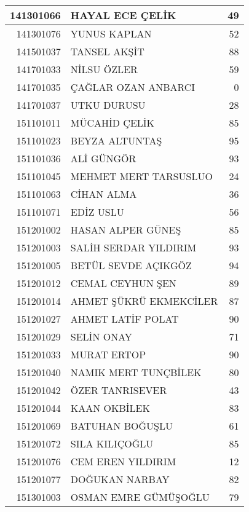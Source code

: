\documentclass[12pt]{article}
\begin{document}
\begin{longtable}{||r||l||r||}
    \midrule
    141301066 & HAYAL ECE ÇELİK & 49 \\
    \midrule
    141301076 & YUNUS KAPLAN & 52 \\
    \midrule
    141501037 & TANSEL AKŞİT & 88 \\
    \midrule
    141701033 & NİLSU ÖZLER & 59 \\
    \midrule
    141701035 & ÇAĞLAR OZAN ANBARCI & 0 \\
    \midrule
    141701037 & UTKU DURUSU & 28 \\
    \midrule
    151101011 & MÜCAHİD ÇELİK & 85 \\
    \midrule
    151101023 & BEYZA ALTUNTAŞ & 95 \\
    \midrule
    151101036 & ALİ GÜNGÖR & 93 \\
    \midrule
    151101045 & MEHMET MERT TARSUSLUO & 24 \\
    \midrule
    151101063 & CİHAN ALMA & 36 \\
    \midrule
    151101071 & EDİZ USLU & 56 \\
    \midrule
    151201002 & HASAN ALPER GÜNEŞ & 85 \\
    \midrule
    151201003 & SALİH SERDAR YILDIRIM & 93 \\
    \midrule
    151201005 & BETÜL SEVDE AÇIKGÖZ & 94 \\
    \midrule
    151201012 & CEMAL CEYHUN ŞEN & 89 \\
    \midrule
    151201014 & AHMET ŞÜKRÜ EKMEKCİLER & 87 \\
    \midrule
    151201027 & AHMET LATİF POLAT & 90 \\
    \midrule
    151201029 & SELİN ONAY & 71 \\
    \midrule
    151201033 & MURAT ERTOP & 90 \\
    \midrule
    151201040 & NAMIK MERT TUNÇBİLEK & 80 \\
    \midrule
    151201042 & ÖZER TANRISEVER & 43 \\
    \midrule
    151201044 & KAAN OKBİLEK & 83 \\
    \midrule
    151201069 & BATUHAN BOĞUŞLU & 61 \\
    \midrule
    151201072 & SILA KILIÇOĞLU & 85 \\
    \midrule
    151201076 & CEM EREN YILDIRIM & 12 \\
    \midrule
    151201077 & DOĞUKAN NARBAY & 82 \\
    \midrule
    151301003 & OSMAN EMRE GÜMÜŞOĞLU & 79 \\

\end{longtable}
\end{document}
